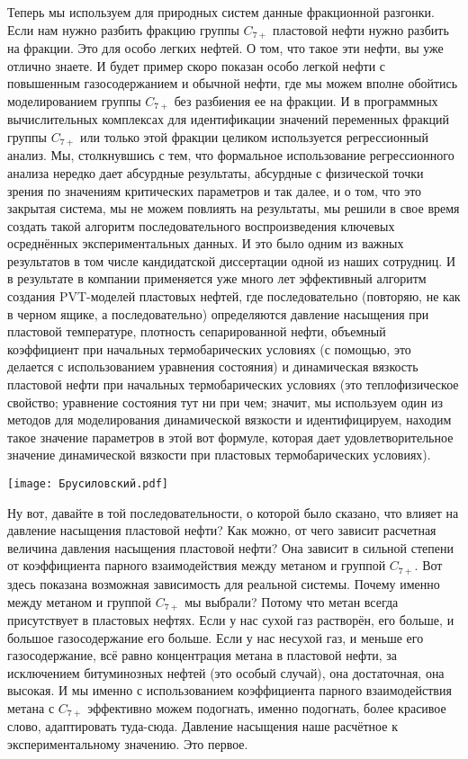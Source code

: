 \documentclass[main.tex]{subfiles}
\begin{document}
Теперь мы используем для природных систем данные фракционной разгонки.
Если нам нужно разбить фракцию группы $C_{7+}$ пластовой нефти нужно разбить на фракции.
Это для особо легких нефтей.
О том, что такое эти нефти, вы уже отлично знаете.
И будет пример скоро показан особо легкой нефти с повышенным газосодержанием и обычной нефти, где мы можем вполне обойтись моделированием группы $C_{7+}$ без разбиения ее на фракции.
И в программных вычислительных комплексах для идентификации значений переменных фракций группы $C_{7+}$ или только этой фракции целиком используется регрессионный анализ.
Мы, столкнувшись с тем, что формальное использование регрессионного анализа нередко дает абсурдные результаты, абсурдные с физической точки зрения по значениям критических параметров и так далее, и о том, что это закрытая система, мы не можем повлиять на результаты, мы решили в свое время создать такой алгоритм последовательного воспроизведения ключевых осреднённых экспериментальных данных.
И это было одним из важных результатов в том числе кандидатской диссертации одной из наших сотрудниц.
И в результате в компании применяется уже много лет эффективный алгоритм создания PVT-моделей пластовых нефтей, где последовательно (повторяю, не как в черном ящике, а последовательно) определяются давление насыщения при пластовой температуре, плотность сепарированной нефти, объемный коэффициент при начальных термобарических условиях (с помощью, это делается с использованием уравнения состояния) и динамическая вязкость пластовой нефти при начальных термобарических условиях (это теплофизическое свойство; уравнение состояния тут ни при чем; значит, мы используем один из методов для моделирования динамической вязкости и идентифицируем, находим такое значение параметров в этой вот формуле, которая дает удовлетворительное значение динамической вязкости при пластовых термобарических условиях).

\begin{center}
\texttt{[image: Брусиловский.pdf]}
\end{center}

Ну вот, давайте в той последовательности, о которой было сказано, что влияет на давление насыщения пластовой нефти?
Как можно, от чего зависит расчетная величина давления насыщения пластовой нефти?
Она зависит в сильной степени от коэффициента парного взаимодействия между метаном и группой $C_{7+}$.
Вот здесь показана возможная зависимость для реальной системы.
Почему именно между метаном и группой $C_{7+}$ мы выбрали?
Потому что метан всегда присутствует в пластовых нефтях.
Если у нас сухой газ растворён, его больше, и большое газосодержание его больше.
Если у нас несухой газ, и меньше его газосодержание, всё равно концентрация метана в пластовой нефти, за исключением битуминозных нефтей (это особый случай), она достаточная, она высокая.
И мы именно с использованием коэффициента парного взаимодействия метана с $C_{7+}$ эффективно можем подогнать, именно подогнать, более красивое слово, адаптировать туда-сюда.
Давление насыщения наше расчётное к экспериментальному значению.
Это первое.
\end{document}
